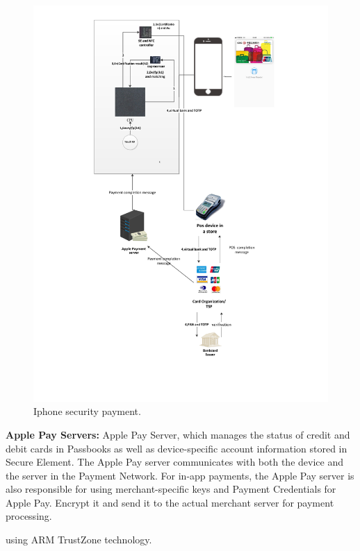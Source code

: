 \documentclass[journal]{IEEEtran}
\begin{document}
\begin{figure}[htbp]
\centerline{\includegraphics[scale=0.5]{iphone_pay.pdf}}
\caption{Iphone security payment.}
\label{fig}
\end{figure}
    
    \textbf{Apple Pay Servers:} Apple Pay Server, which manages the status of credit and debit cards in Passbooks as well as device-specific account information stored in Secure Element. The Apple Pay server communicates with both the device and the server in the Payment Network. For in-app payments, the Apple Pay server is also responsible for using merchant-specific keys and Payment Credentials for Apple Pay. Encrypt it and send it to the actual merchant server for payment processing.

 using ARM TrustZone technology.
\end{document}
